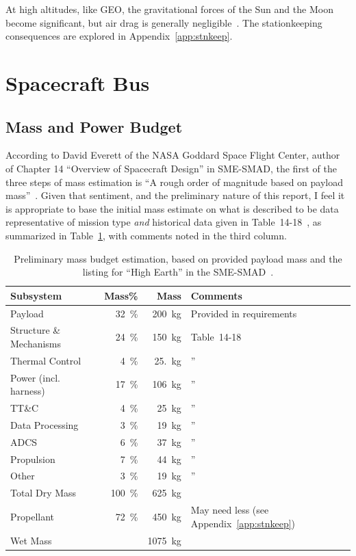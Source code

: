 \documentclass[9pt]{article}
\begin{document}
At high altitudes, like GEO, the gravitational forces of the Sun and the Moon become significant, but air drag is generally negligible~\cite{sse}.
The stationkeeping consequences are explored in Appendix~\ref{app:stnkeep}.

\section{Spacecraft Bus}
\subsection{Mass and Power Budget}
According to David Everett of the NASA Goddard Space Flight Center, author of Chapter 14 ``Overview of Spacecraft Design'' in SME-SMAD, the first of the three steps of mass estimation is ``A rough order of magnitude based on payload mass''~\cite[p. 399]{sme}.
Given that sentiment, and the preliminary nature of this report, I feel it is appropriate to base the initial mass estimate on what is described to be data representative of mission type \textit{and} historical data given in Table~14-18~\cite[p. 422]{sme}, as summarized in Table~\ref{tab:mass}, with comments noted in the third column.

\begin{table}[h]
  \centering
  \begin{tabular}{l|r r l}
    \toprule
    Subsystem & Mass\% & Mass & Comments \\
    \midrule
    Payload & \qty{32}{\percent} & \qty{200}{\kilo\gram} & Provided in requirements \\
    Structure \& Mechanisms & \qty{24}{\percent} & \qty{150}{\kilo\gram} & Table~14-18 \\
    Thermal Control & \qty{4}{\percent} & \qty{25.}{\kilo\gram} & ''\\
    Power (incl. harness) & \qty{17}{\percent} & \qty{106}{\kilo\gram}&''\\
    TT\&C & \qty{4}{\percent} & \qty{25}{\kilo\gram}&''\\
    Data Processing & \qty{3}{\percent} & \qty{19}{\kilo\gram}&''\\
    ADCS & \qty{6}{\percent} & \qty{37}{\kilo\gram}&''\\
    Propulsion & \qty{7}{\percent} & \qty{44}{\kilo\gram}&''\\
    Other & \qty{3}{\percent} & \qty{19}{\kilo\gram}&''\\
    \midrule 
    Total Dry Mass & \qty{100}{\percent} & \qty{625}{\kilo\gram} & \\
    Propellant & \qty{72}{\percent} & \qty{450}{\kilo\gram} & May need less (see Appendix~\ref{app:stnkeep})\\
    \midrule 
    Wet Mass & & \qty{1075}{\kilo\gram} & \\
    \bottomrule
  \end{tabular}
  \caption{Preliminary mass budget estimation, based on provided payload mass and the listing for ``High Earth'' in the SME-SMAD~\cite{sme}.}
  \label{tab:mass}
\end{table}
\end{document}
